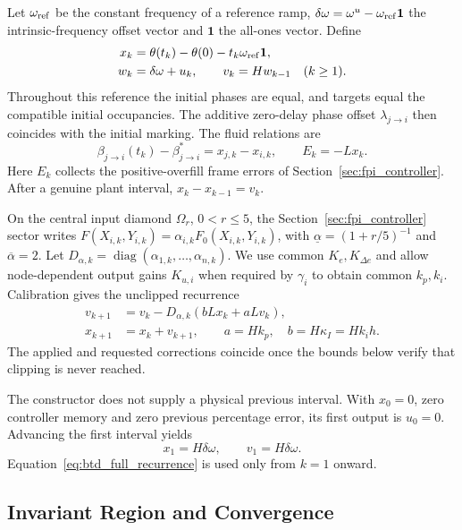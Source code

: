 Let $\omega_{\rm ref}$ be the constant frequency of a reference ramp,
$\delta\omega=\omega^u-\omega_{\rm ref}\mathbf1$ the intrinsic-frequency
offset vector and $\mathbf1$ the all-ones vector. Define
\begin{align}
 x_k&=\theta(t_k)-\theta(0)-t_k\omega_{\rm ref}\mathbf1,\nonumber\\
 w_k&=\delta\omega+u_k,\qquad v_k=Hw_{k-1}\quad(k\ge1).
 \label{eq:btd_ref_state}
\end{align}
Throughout this reference the initial phases are equal, and targets equal
the compatible initial occupancies. The additive zero-delay phase offset
$\lambda_{j\to i}$ then coincides with the initial marking. The fluid relations are
\begin{equation}
 \beta_{j\to i}(t_k)-\beta^*_{j\to i}=x_{j,k}-x_{i,k},
 \qquad E_k=-Lx_k.
 \label{eq:btd_buffer_phase}
\end{equation}
Here $E_k$ collects the positive-overfill frame errors of Section~\ref{sec:fpi_controller}.
After a genuine plant interval, $x_k-x_{k-1}=v_k$.

On the central input diamond $\Omega_r$, $0<r\le5$, the Section~\ref{sec:fpi_controller} sector writes
$F(X_{i,k},Y_{i,k})=\alpha_{i,k}F_0(X_{i,k},Y_{i,k})$, with
$\underline\alpha=(1+r/5)^{-1}$ and $\overline\alpha=2$.
Let $D_{\alpha,k}=\operatorname{diag}(\alpha_{1,k},\ldots,\alpha_{n,k})$.
We use common $K_e,K_{\Delta e}$ and allow node-dependent output gains
$K_{u,i}$ when required by $\gamma_i$ to obtain common $k_p,k_i$.
Calibration gives the unclipped recurrence
\begin{align}
 v_{k+1}&=v_k-D_{\alpha,k}(bLx_k+aLv_k),\nonumber\\
 x_{k+1}&=x_k+v_{k+1},\qquad
 a=Hk_p,\quad b=H\kappa_I=Hk_i h.
 \label{eq:btd_full_recurrence}
\end{align}
The applied and requested corrections coincide once the bounds below
verify that clipping is never reached.

The constructor does not supply a physical previous interval. With
$x_0=0$, zero controller memory and zero previous percentage error, its
first output is $u_0=0$. Advancing the first interval yields
\begin{equation}
 x_1=H\delta\omega,\qquad v_1=H\delta\omega.
 \label{eq:btd_bootstrap}
\end{equation}
Equation~\eqref{eq:btd_full_recurrence} is used only from $k=1$ onward.

\subsection{Invariant Region and Convergence}
\label{subsec:btd_ref_certificate}

